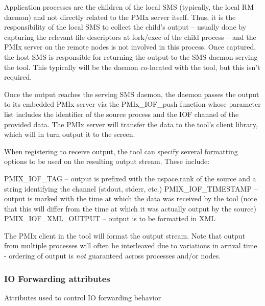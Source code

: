 Application processes are the children of the local SMS (typically, the local RM daemon) and not directly related to the PMIx server itself. Thus, it is the responsibility of the local SMS to collect the child’s output – usually done by capturing the relevant file descriptors at fork/exec of the child process – and the PMIx server on the remote nodes is not involved in this process. Once captured, the host SMS is responsible for returning the output to the SMS daemon serving the tool. This typically will be the daemon co-located with the tool, but this isn’t required.

Once the output reaches the serving SMS daemon, the daemon passes the output to its embedded PMIx server via the PMIx_IOF_push function whose parameter list includes the identifier of the source process and the IOF channel of the provided data. The PMIx server will transfer the data to the tool’s client library, which will in turn output it to the screen.

When registering to receive output, the tool can specify several formatting options to be used on the resulting output stream. These include:

    PMIX_IOF_TAG – output is prefixed with the nspace,rank of the source and a string identifying the channel (stdout, stderr, etc.)
    PMIX_IOF_TIMESTAMP – output is marked with the time at which the data was received by the tool (note that this will differ from the time at which it was actually output by the source)
    PMIX_IOF_XML_OUTPUT – output is to be formatted in XML

The PMIx client in the tool will format the output stream. Note that output from multiple processes will often be interleaved due to variations in arrival time - ordering of output is \emph{not} guaranteed across processes and/or nodes.

\subsubsection{IO Forwarding attributes}
\label{api:struct:attributes:security}

Attributes used to control IO forwarding behavior

%

%

